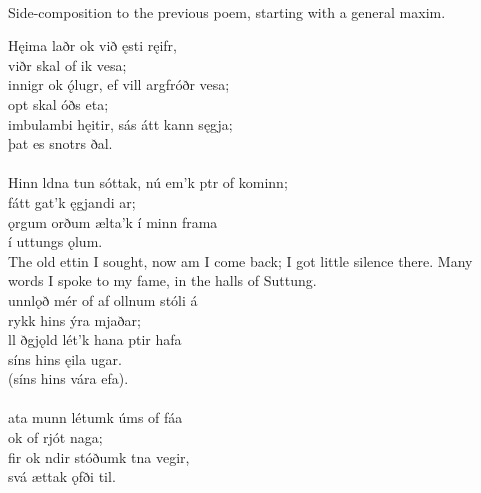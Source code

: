  \\

	Side-composition to the previous poem, starting with a general maxim.

\bva Hęima laðr \hld ok við ęsti ręifr, \\%
\ind {}viðr skal of ik vesa; \\%
innigr ok ǫ́lugr, \hld ef vill argfróðr vesa; \\%
\ind opt skal óðs eta; \\%
imbulambi hęitir, \hld sás átt kann sęgja; \\%
\ind þat es snotrs ðal.\\%

 \\

\bva Hinn ldna tun sóttak, \hld nú em'k ptr of kominn; \\%
\ind fátt gat'k ęgjandi ar; \\%
ǫrgum orðum \hld {}ælta'k í minn frama \\%
\ind í uttungs ǫlum.\\%

\bvb The old ettin I sought, now am I come back; I got little silence there. Many words I spoke to my fame, in the halls of Suttung. \\

\bva {}unnlǫð mér of af \hld {}ollnum stóli á \\%
\ind {}rykk hins ýra mjaðar; \\%
ll ðgjǫld \hld lét'k hana ptir hafa \\%
\ind síns hins ęila ugar. \\%
\ind (síns hins vára efa).\\%

 \\

\bva {}ata munn \hld létumk úms of fáa \\%
\ind ok of rjót naga; \\%
fir ok ndir \hld stóðumk tna vegir, \\%
\ind svá ættak ǫfði til.\\%

 \\

